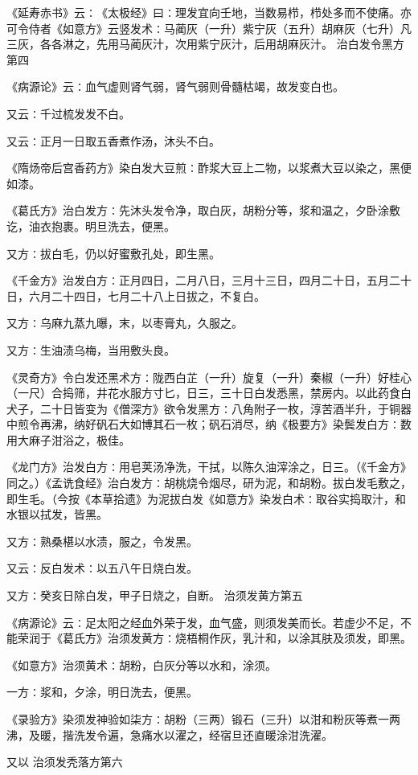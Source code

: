 \documentclass[a4paper,12pt,UTF8,twoside]{ctexbook}
\begin{document}
《延寿赤书》云∶《太极经》曰∶理发宜向壬地，当数易栉，栉处多而不使痛。亦可令侍者《如意方》云竖发术∶马蔺灰（一升）紫宁灰（五升）胡麻灰（七升）凡三灰，各各淋之，先用马蔺灰汁，次用紫宁灰汁，后用胡麻灰汁。
治白发令黑方第四

《病源论》云∶血气虚则肾气弱，肾气弱则骨髓枯竭，故发变白也。

又云∶千过梳发发不白。

又云∶正月一日取五香煮作汤，沐头不白。

《隋炀帝后宫香药方》染白发大豆煎∶酢浆大豆上二物，以浆煮大豆以染之，黑便如漆。

《葛氏方》治白发方∶先沐头发令净，取白灰，胡粉分等，浆和温之，夕卧涂敷讫，油衣抱裹。明旦洗去，便黑。

又方∶拔白毛，仍以好蜜敷孔处，即生黑。

《千金方》治发白方∶正月四日，二月八日，三月十三日，四月二十日，五月二十日，六月二十四日，七月二十八上日拔之，不复白。

又方∶乌麻九蒸九曝，末，以枣膏丸，久服之。

又方∶生油渍乌梅，当用敷头良。

《灵奇方》令白发还黑术方∶陇西白芷（一升）旋复（一升）秦椒（一升）好桂心（一尺）合捣筛，井花水服方寸匕，日三，三十日白发悉黑，禁房内。以此药食白犬子，二十日皆变为《僧深方》欲令发黑方∶八角附子一枚，淳苦酒半升，于铜器中煎令再沸，纳好矾石大如博其石一枚；矾石消尽，纳《极要方》染鬓发白方∶数用大麻子泔浴之，极佳。

《龙门方》治发白方∶用皂荚汤净洗，干拭，以陈久油滓涂之，日三。（《千金方》同之。）《孟诜食经》治白发方∶胡桃烧令烟尽，研为泥，和胡粉。拔白发毛敷之，即生毛。（今按《本草拾遗》为泥拔白发《如意方》染发白术∶取谷实捣取汁，和水银以拭发，皆黑。

又方∶熟桑椹以水渍，服之，令发黑。

又云∶反白发术∶以五八午日烧白发。

又方∶癸亥日除白发，甲子日烧之，自断。
治须发黄方第五

《病源论》云∶足太阳之经血外荣于发，血气盛，则须发美而长。若虚少不足，不能荣润于《葛氏方》治须发黄方∶烧梧桐作灰，乳汁和，以涂其肤及须发，即黑。

《如意方》治须黄术∶胡粉，白灰分等以水和，涂须。

一方∶浆和，夕涂，明日洗去，便黑。

《录验方》染须发神验如柒方∶胡粉（三两）锻石（三升）以泔和粉灰等煮一两沸，及暖，揩洗发令遍，急痛水以濯之，经宿旦还直暖涂泔洗濯。

又以
治须发秃落方第六
\end{document}
